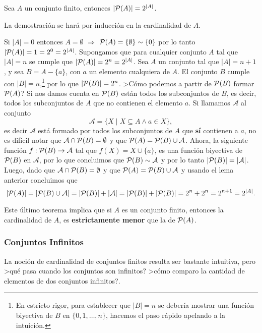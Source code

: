 \begin{teorema} 
Sea $A$ un conjunto finito, entonces $|\P(A)|=2^{|A|}$.

\begin{demostracion}
La demostración se hará por inducción en la cardinalidad de $A$.
\begin{inducciondemo}
  \BI Si $|A|=0$ entonces $A=\emptyset$ $\Rightarrow$ $\P(A)=\{\emptyset\}\eqr\{0\}$ por lo tanto $|\P(A)|=1=2^0=2^{|A|}$.
  \HI Supongamos que para cualquier conjunto $A$ tal que $|A|=n$ se cumple que $|\P(A)|=2^n=2^{|A|}$.
  \TI Sea $A$ un conjunto tal que $|A|=n+1$, y sea $B=A-\{a\}$, con $a$ un elemento cualquiera de $A$.
  El conjunto $B$ cumple con $|B|=n$,\footnote{En estricto rigor, para establecer que $|B|=n$ se debería mostrar una función biyectiva de $B$ en $\{0,1,\ldots,n\}$, hacemos el paso rápido apelando a la intuición.} por lo que $|\P(B)|=2^n$.
  >Cómo podemos a partir de $\P(B)$ formar $\P(A)$?
  Si nos damos cuenta en $\P(B)$ están todos los subconjuntos de $B$, es decir, todos los subconjuntos de $A$ que no contienen el elemento $a$.
  Si llamamos $\mathcal A$ al conjunto
  \[
  \mathcal A=\{X\;|\;X\subseteq A\wedge a\in X\},
  \]
  es decir $\mathcal A$ está formado por todos los subconjuntos de $A$ que {\bf sí} contienen a $a$, no es difícil notar que $\mathcal A\cap\P(B)=\emptyset$ y que $\P(A)=\P(B)\cup\mathcal A$.
  Ahora, la siguiente función $f:\P(B)\rightarrow\mathcal A$ tal que $f(X)=X\cup\{a\}$, es una función biyectiva de $\P(B)$ en $\mathcal A$, por lo que concluimos que $\P(B)\eqr\mathcal A$ y por lo tanto $|\P(B)|=|\mathcal A|$.
  Luego, dado que $\mathcal A\cap\P(B)=\emptyset$ y que $\P(A)=\P(B)\cup\mathcal A$ y usando el lema anterior concluimos que 
  \[
  |\P(A)|=|\P(B)\cup\mathcal A|=|\P(B)|+|\mathcal A|=|\P(B)|+|\P(B)|=2^n+2^n=2^{n+1}=2^{|A|}.
  \]
\end{inducciondemo}
\end{demostracion}
\end{teorema}

Este último teorema implica que si $A$ es un conjunto finito, entonces la cardinalidad de $A$, es {\bf estrictamente menor} que la de $\P(A)$.

\subsubsection*{Conjuntos Infinitos}
La noción de cardinalidad de conjuntos finitos resulta ser bastante intuitiva, pero >qué pasa cuando los conjuntos son infinitos? >cómo comparo la cantidad de elementos de dos conjuntos infinitos?.

